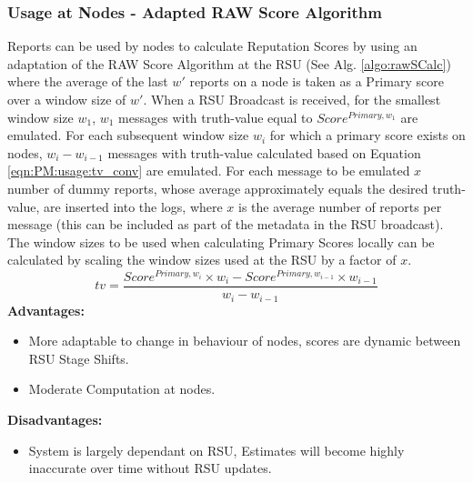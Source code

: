 \documentclass[journal]{IEEEtran}
\begin{document}
\subsubsection{Usage at Nodes - Adapted RAW Score Algorithm}
\label{sec:PM:usage:raw@node}
Reports can be used by nodes to calculate Reputation Scores by using an adaptation of the RAW Score Algorithm at the RSU (See Alg. \ref{algo:rawSCalc}) where the average of the last $ w' $ reports on a node is taken as a Primary score over a window size of $ w' $. When a RSU Broadcast is received, for the smallest window size $ w_1 $, $ w_1 $ messages with truth-value equal to $ Score^{Primary,w_1} $ are emulated. For each subsequent window size $ w_i $ for which a primary score exists on nodes, $ w_i - w_{i-1} $ messages with truth-value calculated based on Equation \ref{eqn:PM:usage:tv_conv} are emulated. For each message to be emulated $ x $ number of dummy reports, whose average approximately equals the desired truth-value, are inserted into the logs, where $ x $ is the average number of reports per message (this can be included as part of the metadata in the RSU broadcast). The window sizes to be used when calculating Primary Scores locally can be calculated by scaling the window sizes used at the RSU by a factor of $ x $.
	\begin{equation}
	\label{eqn:PM:usage:tv_conv}
		tv = \frac{Score^{Primary,w_i}\times w_i - Score^{Primary,w_{i-1}}\times w_{i-1}}{w_i - w_{i-1}}
	\end{equation}
\textbf{Advantages:}
	\begin{itemize}
		\item More adaptable to change in behaviour of nodes, scores are dynamic between RSU Stage Shifts.
		\item Moderate Computation at nodes.
	\end{itemize}
\textbf{Disadvantages:} 
	\begin{itemize}
		\item System is largely dependant on RSU, Estimates will become highly inaccurate over time without RSU updates.
	\end{itemize}
\end{document}
